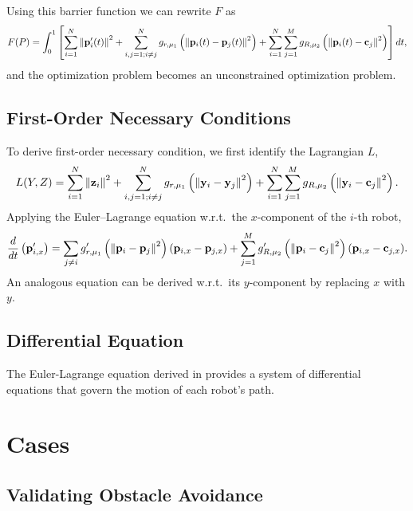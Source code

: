 \documentclass[11pt]{article}
\begin{document}
Using this barrier function we can rewrite \(F\) as
\begin{equation}
    F(P) = \int_0^1 \left[ \sum_{i=1}^{N} \left\lVert \mathbf{p}'_i(t) \right\rVert^2 + \sum_{i,j = 1; i \neq j}^{N} g_{r,\mu_1}\left( \left\lVert \mathbf{p}_i(t) - \mathbf{p}_j(t) \right\rVert^2 \right) + \sum_{i=1}^{N} \sum_{j=1}^{M} g_{R,\mu_2}\left( \left\lVert \mathbf{p}_i(t) - \mathbf{c}_j \right\rVert^2 \right) \right] dt,
\end{equation}
and the optimization problem becomes an unconstrained optimization problem.

\subsection{First-Order Necessary Conditions}

To derive first-order necessary condition, we first identify the Lagrangian \(L\),
\begin{equation}
    L(Y,Z) = \sum_{i=1}^{N} \left\lVert \mathbf{z}_i \right\rVert^2 + \sum_{i,j = 1; i \neq j}^{N} g_{r,\mu_1}\left( \left\lVert \mathbf{y}_i - \mathbf{y}_j \right\rVert^2 \right) + \sum_{i=1}^{N} \sum_{j=1}^{M} g_{R,\mu_2}\left( \left\lVert \mathbf{y}_i - \mathbf{c}_j \right\rVert^2 \right).
\end{equation}
Applying the Euler--Lagrange equation w.r.t.\ the \(x\)-component of the \(i\)-th robot,
\begin{equation}
    \frac{d}{dt}\left(\mathbf{p}'_{i,x}\right) = \sum_{j \neq i} g'_{r,\mu_1}\left( \left\lVert \mathbf{p}_i - \mathbf{p}_j \right\rVert^2 \right) (\mathbf{p}_{i,x} - \mathbf{p}_{j,x}) + \sum_{j=1}^{M} g'_{R,\mu_2}\left( \left\lVert \mathbf{p}_i - \mathbf{c}_j \right\rVert^2 \right) (\mathbf{p}_{i,x} - \mathbf{c}_{j,x}).
    \label{eq:EL}
\end{equation}
An analogous equation can be derived w.r.t.\ its \(y\)-component by replacing \(x\) with \(y\).

\subsection{Differential Equation}

The Euler-Lagrange equation derived in  provides a system of differential equations that govern the motion of each robot's path.

\section{Cases}

\subsection{Validating Obstacle Avoidance}
\end{document}
